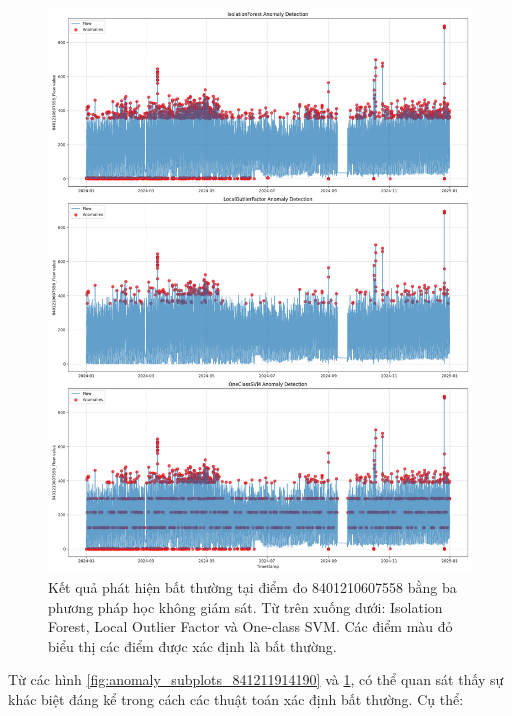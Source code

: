 \begin{figure}[htbp]
    \centering
    \includegraphics[width=\textwidth]{image/section6_1/anomalies_subplots_8401210607558.png}
    \caption{Kết quả phát hiện bất thường tại điểm đo 8401210607558 bằng ba phương pháp học không giám sát. Từ trên xuống dưới: Isolation Forest, Local Outlier Factor và One-class SVM. Các điểm màu đỏ biểu thị các điểm được xác định là bất thường.}
    \label{fig:anomaly_subplots_8401210607558}
\end{figure}

Từ các hình \ref{fig:anomaly_subplots_841211914190} và \ref{fig:anomaly_subplots_8401210607558}, có thể quan sát thấy sự khác biệt đáng kể trong cách các thuật toán xác định bất thường. Cụ thể:

